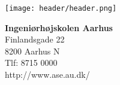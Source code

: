 

{}
\thispagestyle{empty}

\begin{minipage}[t]{0.68\textwidth}
\vspace*{-8pt}			
\texttt{[image: header/header.png]}
\end{minipage}
\hfill
\begin{minipage}[t]{0.48\textwidth}
{\small 
\textbf{Ingeniørhøjskolen Aarhus}\\
Finlandsgade 22 \\
8200 Aarhus N \\
Tlf: 8715 0000 \\
http://www.ase.au.dk/}
\end{minipage}

\vspace*{3cm}

